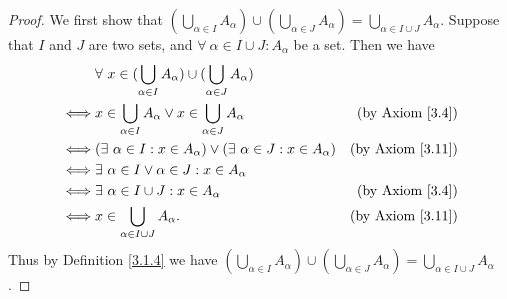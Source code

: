 \begin{proof}
    We first show that \((\bigcup_{\alpha \in I} A_{\alpha}) \cup (\bigcup_{\alpha \in J} A_{\alpha}) = \bigcup_{\alpha \in I \cup J} A_{\alpha}\).
    Suppose that \(I\) and \(J\) are two sets, and \(\forall\ \alpha \in I \cup J : A_{\alpha}\) be a set.
    Then we have
    \begin{align*}
             & \forall\ x \in (\bigcup_{\alpha \in I} A_{\alpha}) \cup (\bigcup_{\alpha \in J} A_{\alpha})                                \\
        \iff & x \in \bigcup_{\alpha \in I} A_{\alpha} \lor x \in \bigcup_{\alpha \in J} A_{\alpha}        & \text{(by Axiom \ref{3.4})}  \\
        \iff & (\exists\ \alpha \in I : x \in A_{\alpha}) \lor (\exists\ \alpha \in J : x \in A_{\alpha})  & \text{(by Axiom \ref{3.11})} \\
        \iff & \exists\ \alpha \in I \lor \alpha \in J : x \in A_{\alpha}                                                                 \\
        \iff & \exists\ \alpha \in I \cup J : x \in A_{\alpha}                                             & \text{(by Axiom \ref{3.4})}  \\
        \iff & x \in \bigcup_{\alpha \in I \cup J} A_{\alpha}.                                             & \text{(by Axiom \ref{3.11})}
    \end{align*}
    Thus by Definition \ref{3.1.4} we have \((\bigcup_{\alpha \in I} A_{\alpha}) \cup (\bigcup_{\alpha \in J} A_{\alpha}) = \bigcup_{\alpha \in I \cup J} A_{\alpha}\).


\end{proof}
